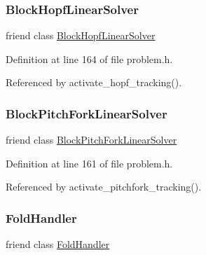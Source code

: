 \subsubsection{\texorpdfstring{Block\+Hopf\+Linear\+Solver}{BlockHopfLinearSolver}}
{\footnotesize\ttfamily friend class \hyperlink{classoomph_1_1BlockHopfLinearSolver}{Block\+Hopf\+Linear\+Solver}\hspace{0.3cm}{\ttfamily [friend]}}



Definition at line 164 of file problem.\+h.



Referenced by activate\+\_\+hopf\+\_\+tracking().

\mbox{\label{classoomph_1_1Problem_aba62ac8cc057be07657972adc4a78b45}} 
\subsubsection{\texorpdfstring{Block\+Pitch\+Fork\+Linear\+Solver}{BlockPitchForkLinearSolver}}
{\footnotesize\ttfamily friend class \hyperlink{classoomph_1_1BlockPitchForkLinearSolver}{Block\+Pitch\+Fork\+Linear\+Solver}\hspace{0.3cm}{\ttfamily [friend]}}



Definition at line 161 of file problem.\+h.



Referenced by activate\+\_\+pitchfork\+\_\+tracking().

\mbox{\label{classoomph_1_1Problem_a1d79584bd556f960d5b92474681e0159}} 
\subsubsection{\texorpdfstring{Fold\+Handler}{FoldHandler}}
{\footnotesize\ttfamily friend class \hyperlink{classoomph_1_1FoldHandler}{Fold\+Handler}\hspace{0.3cm}{\ttfamily [friend]}}



